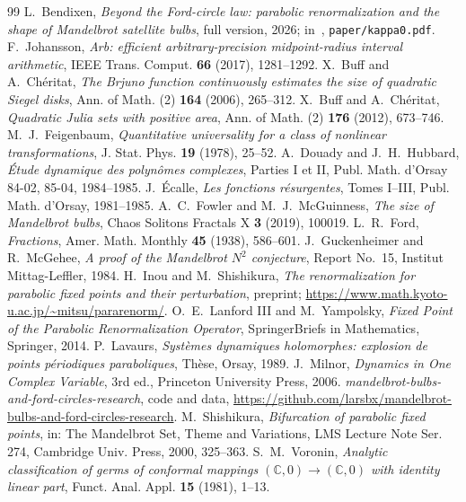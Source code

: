 \documentclass[11pt]{amsart}
\theoremstyle{definition}
\theoremstyle{remark}
\newcommand{\C}{\mathbb{C}}
\begin{document}
{\raggedright\begin{thebibliography}{99}
 L.~Bendixen, \emph{Beyond the Ford-circle law: parabolic renormalization and the shape of Mandelbrot satellite bulbs}, full version, 2026; in~\cite{repo}, \texttt{paper/kappa0.pdf}.
 F.~Johansson, \emph{Arb: efficient arbitrary-precision midpoint-radius interval arithmetic}, IEEE Trans. Comput. \textbf{66} (2017), 1281--1292.
 X.~Buff and A.~Ch\'eritat, \emph{The Brjuno function continuously estimates the size of quadratic Siegel disks}, Ann. of Math. (2) \textbf{164} (2006), 265--312.
 X.~Buff and A.~Ch\'eritat, \emph{Quadratic Julia sets with positive area}, Ann. of Math. (2) \textbf{176} (2012), 673--746.
 M.~J.~Feigenbaum, \emph{Quantitative universality for a class of nonlinear transformations}, J. Stat. Phys. \textbf{19} (1978), 25--52.
 A.~Douady and J.~H.~Hubbard, \emph{\'Etude dynamique des polyn\^omes complexes}, Parties I et II, Publ. Math. d'Orsay 84-02, 85-04, 1984--1985.
 J.~\'Ecalle, \emph{Les fonctions r\'esurgentes}, Tomes I--III, Publ. Math. d'Orsay, 1981--1985.
 A.~C.~Fowler and M.~J.~McGuinness, \emph{The size of Mandelbrot bulbs}, Chaos Solitons Fractals X \textbf{3} (2019), 100019.
 L.~R.~Ford, \emph{Fractions}, Amer. Math. Monthly \textbf{45} (1938), 586--601.
 J.~Guckenheimer and R.~McGehee, \emph{A proof of the Mandelbrot $N^2$ conjecture}, Report No.~15, Institut Mittag-Leffler, 1984.
 H.~Inou and M.~Shishikura, \emph{The renormalization for parabolic fixed points and their perturbation}, preprint; \url{https://www.math.kyoto-u.ac.jp/~mitsu/pararenorm/}.
 O.~E.~Lanford III and M.~Yampolsky, \emph{Fixed Point of the Parabolic Renormalization Operator}, SpringerBriefs in Mathematics, Springer, 2014.
 P.~Lavaurs, \emph{Syst\`emes dynamiques holomorphes: explosion de points p\'eriodiques paraboliques}, Th\`ese, Orsay, 1989.
 J.~Milnor, \emph{Dynamics in One Complex Variable}, 3rd ed., Princeton University Press, 2006.
 \emph{mandelbrot-bulbs-and-ford-circles-research}, code and data, \url{https://github.com/larsbx/mandelbrot-bulbs-and-ford-circles-research}.
 M.~Shishikura, \emph{Bifurcation of parabolic fixed points}, in: The Mandelbrot Set, Theme and Variations, LMS Lecture Note Ser. 274, Cambridge Univ. Press, 2000, 325--363.
 S.~M.~Voronin, \emph{Analytic classification of germs of conformal mappings $(\C,0)\to(\C,0)$ with identity linear part}, Funct. Anal. Appl. \textbf{15} (1981), 1--13.
\end{thebibliography}}
\end{document}
